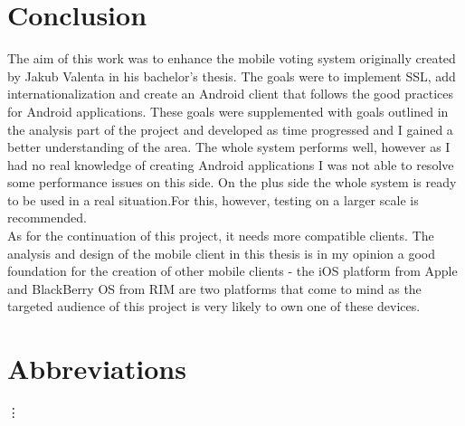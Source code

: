 \documentclass[11pt,twoside,a4paper]{book}
\begin{document}
\chapter{Conclusion}
The aim of this work was to enhance the mobile voting system originally  created by Jakub Valenta in his bachelor's thesis. The goals were to implement SSL, add internationalization and create an Android client that follows the good practices for Android applications. These goals were supplemented with goals outlined in the analysis part of the project and developed as time progressed and I gained a better understanding of the area. The whole system performs well, however as I had no real knowledge of creating Android applications I was not able to resolve some performance issues on this side. On the plus side the whole system is ready to be used in a real situation.For this, however, testing on a larger scale is recommended.\\

As for the continuation of this project, it needs more compatible clients. The analysis and design of the mobile client in this thesis is in my opinion a good foundation for the creation of other mobile clients - the iOS platform from Apple and BlackBerry OS from RIM are two platforms that come to mind as the targeted audience of this project is very likely to own one of these devices.  




{
\def\CS{$\cal C\kern-0.1667em\lower.5ex\hbox{$\cal S$}\kern-0.075em $}

}

%


\appendix



\chapter{Abbreviations}

\begin{description}
\item
\end{description}
\vdots
\end{document}
